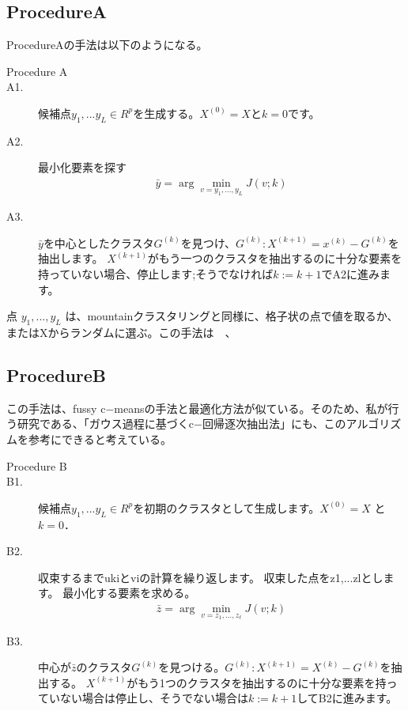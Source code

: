 \documentclass[10pt,onecolumn]{jsarticle}
\begin{document}
\subsection{ProcedureA}
ProcedureAの手法は以下のようになる。
\begin{description}
	\item[Procedure A]
	\item[A1.] 候補点$y_1,... y_L\in R^p$を生成する。$X^{(0)}= X$と$k= 0$です。
	\item[A2.]最小化要素を探す
	\begin{align}
		\bar{y}=\arg \min _{v=y_{1}, \ldots, y_{L}} J(v ; k)
	\end{align}
	\item[A3.]$\bar{y}$を中心としたクラスタ$G^{(k)}$を見つけ、$G^{(k)}:X^{(k+1)}=x^{(k)}-G^{(k)}$を抽出します。
	$X^{(k+1)}$がもう一つのクラスタを抽出するのに十分な要素を持っていない場合、停止します;そうでなければ$k := k+1$でA2に進みます。
\end{description}
点 $y_1,...,y_L$ は、mountainクラスタリングと同様に、格子状の点で値を取るか、またはXからランダムに選ぶ。この手法は　、

\subsection{ProcedureB}
この手法は、fussy c$-$meansの手法と最適化方法が似ている。そのため、私が行う研究である、「ガウス過程に基づくc$-$回帰逐次抽出法」にも、このアルゴリズムを参考にできると考えている。

\begin{description}
	\item[Procedure B]
	\item[B1.] 候補点$y_1,...y_L \in R^p$を初期のクラスタとして生成します。$X^{(0)}=X$ と $k=0$．
	\item[B2.] 収束するまでukiとviの計算を繰り返します。
	収束した点をz1,...zlとします。
	最小化する要素を求める。
	\begin{align}
		\label{z}
		\bar{z}=\arg \min _{v=z_{1}, \ldots, z_{\ell}} J(v ; k)
	\end{align}
	\item[B3.]中心が$\bar{z}$のクラスタ$G^{(k)}$を見つける。$G^{(k)}:X^{(k+1)}=X^{(k)}-G^{(k)}$を抽出する。
	$X^{(k+1)}$がもう1つのクラスタを抽出するのに十分な要素を持っていない場合は停止し、そうでない場合は$k := k + 1$してB2に進みます。
\end{description}
\end{document}
